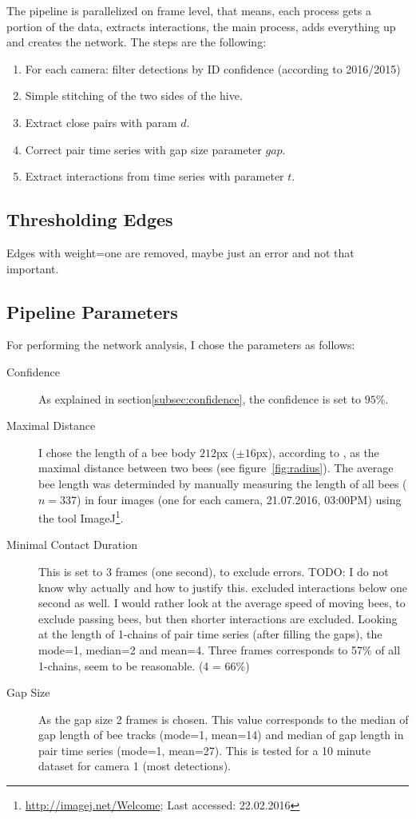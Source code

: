 The pipeline is parallelized on frame level, that means, each process gets a portion of the data, extracts interactions, the main process, adds everything up and creates the network. The steps are the following:

\begin{enumerate}
\item For each camera: filter detections by ID confidence (according to 2016/2015)
\item Simple stitching of the two sides of the hive.
\item Extract close pairs with param $d$.
\item Correct pair time series with gap size parameter $gap$.
\item Extract interactions from time series with parameter $t$.
\end{enumerate}


\subsection{Thresholding Edges}
Edges with weight=one are removed, maybe just an error and not that important.

\subsection{Pipeline Parameters}
For performing the network analysis, I chose the parameters as follows:

\begin{description}
\item[Confidence] As explained in section\ref{subsec:confidence}, the confidence is set to $95\%$.
\item[Maximal Distance] I chose the length of a bee body $212$px ($\pm 16$px), according to \textcite{baracchi2014socio}, as the maximal distance between two bees (see figure~\ref{fig:radius}). The average bee length was determinded by manually measuring the length of all bees ($n=337$) in four images (one for each camera, 21.07.2016, 03:00PM) using the tool ImageJ\footnote{\url{http://imagej.net/Welcome}; Last accessed: 22.02.2016}.
\item[Minimal Contact Duration] This is set to 3 frames (one second), to exclude errors. TODO: I do not know why actually and how to justify this. \textcite{mersch2013tracking} excluded interactions below one second as well. I would rather look at the average speed of moving bees, to exclude passing bees, but then shorter interactions are excluded. Looking at the length of 1-chains of pair time series (after filling the gaps), the mode=1, median=2 and mean=4. Three frames corresponds to 57\% of all 1-chains, seem to be reasonable. (4 = 66\%)
\item[Gap Size] As the gap size 2 frames is chosen. This value corresponds to the median of gap length of bee tracks (mode=1, mean=14) and median of gap length in pair time series (mode=1, mean=27). This is tested for a 10 minute dataset for camera 1 (most detections).
\end{description}


